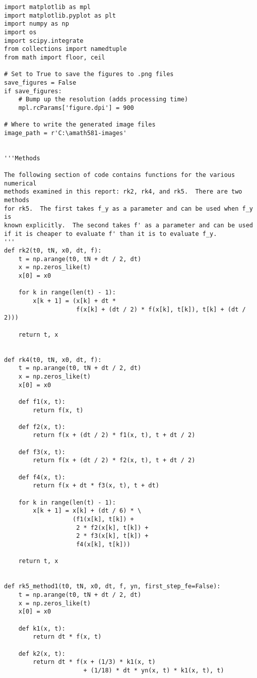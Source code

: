 \documentclass{article}
\begin{document}
\begin{verbatim}
import matplotlib as mpl
import matplotlib.pyplot as plt
import numpy as np
import os
import scipy.integrate
from collections import namedtuple
from math import floor, ceil

# Set to True to save the figures to .png files
save_figures = False
if save_figures:
    # Bump up the resolution (adds processing time)
    mpl.rcParams['figure.dpi'] = 900

# Where to write the generated image files
image_path = r'C:\amath581-images'


'''Methods

The following section of code contains functions for the various numerical
methods examined in this report: rk2, rk4, and rk5.  There are two methods
for rk5.  The first takes f_y as a parameter and can be used when f_y is
known explicitly.  The second takes f' as a parameter and can be used
if it is cheaper to evaluate f' than it is to evaluate f_y.
'''
def rk2(t0, tN, x0, dt, f):
    t = np.arange(t0, tN + dt / 2, dt)
    x = np.zeros_like(t)
    x[0] = x0

    for k in range(len(t) - 1):
        x[k + 1] = (x[k] + dt *
                    f(x[k] + (dt / 2) * f(x[k], t[k]), t[k] + (dt / 2)))

    return t, x


def rk4(t0, tN, x0, dt, f):
    t = np.arange(t0, tN + dt / 2, dt)
    x = np.zeros_like(t)
    x[0] = x0

    def f1(x, t):
        return f(x, t)

    def f2(x, t):
        return f(x + (dt / 2) * f1(x, t), t + dt / 2)

    def f3(x, t):
        return f(x + (dt / 2) * f2(x, t), t + dt / 2)

    def f4(x, t):
        return f(x + dt * f3(x, t), t + dt)

    for k in range(len(t) - 1):
        x[k + 1] = x[k] + (dt / 6) * \
                   (f1(x[k], t[k]) +
                    2 * f2(x[k], t[k]) +
                    2 * f3(x[k], t[k]) +
                    f4(x[k], t[k]))

    return t, x


def rk5_method1(t0, tN, x0, dt, f, yn, first_step_fe=False):
    t = np.arange(t0, tN + dt / 2, dt)
    x = np.zeros_like(t)
    x[0] = x0

    def k1(x, t):
        return dt * f(x, t)

    def k2(x, t):
        return dt * f(x + (1/3) * k1(x, t)
                      + (1/18) * dt * yn(x, t) * k1(x, t), t)


\end{verbatim}
\end{document}
